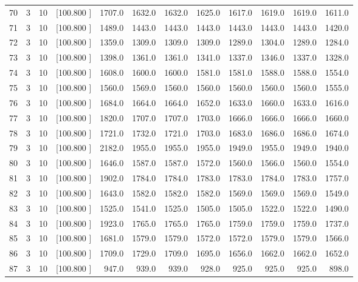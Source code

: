 \documentclass[12pt,a4paper]{article}
\begin{document}
\begin{center}
{\begin{tabular}{r r r r r r r r r r r r}
  70&  3& 10&[100.800   ]&  1707.0&  1632.0&  1632.0&  1625.0&  1617.0&  1619.0&  1619.0&  1611.0\\[-0.02in]
  71&  3& 10&[100.800   ]&  1489.0&  1443.0&  1443.0&  1443.0&  1443.0&  1443.0&  1443.0&  1420.0\\[-0.02in]
  72&  3& 10&[100.800   ]&  1359.0&  1309.0&  1309.0&  1309.0&  1289.0&  1304.0&  1289.0&  1284.0\\[-0.02in]
  73&  3& 10&[100.800   ]&  1398.0&  1361.0&  1361.0&  1341.0&  1337.0&  1346.0&  1337.0&  1328.0\\[-0.02in]
  74&  3& 10&[100.800   ]&  1608.0&  1600.0&  1600.0&  1581.0&  1581.0&  1588.0&  1588.0&  1554.0\\[-0.02in]
  75&  3& 10&[100.800   ]&  1560.0&  1569.0&  1560.0&  1560.0&  1560.0&  1560.0&  1560.0&  1555.0\\[-0.02in]
  76&  3& 10&[100.800   ]&  1684.0&  1664.0&  1664.0&  1652.0&  1633.0&  1660.0&  1633.0&  1616.0\\[-0.02in]
  77&  3& 10&[100.800   ]&  1820.0&  1707.0&  1707.0&  1703.0&  1666.0&  1666.0&  1666.0&  1660.0\\[-0.02in]
  78&  3& 10&[100.800   ]&  1721.0&  1732.0&  1721.0&  1703.0&  1683.0&  1686.0&  1686.0&  1674.0\\[-0.02in]
  79&  3& 10&[100.800   ]&  2182.0&  1955.0&  1955.0&  1955.0&  1949.0&  1955.0&  1949.0&  1940.0\\[-0.02in]
  80&  3& 10&[100.800   ]&  1646.0&  1587.0&  1587.0&  1572.0&  1560.0&  1566.0&  1560.0&  1554.0\\[-0.02in]
  81&  3& 10&[100.800   ]&  1902.0&  1784.0&  1784.0&  1783.0&  1783.0&  1784.0&  1783.0&  1757.0\\[-0.02in]
  82&  3& 10&[100.800   ]&  1643.0&  1582.0&  1582.0&  1582.0&  1569.0&  1569.0&  1569.0&  1549.0\\[-0.02in]
  83&  3& 10&[100.800   ]&  1525.0&  1541.0&  1525.0&  1505.0&  1505.0&  1522.0&  1522.0&  1490.0\\[-0.02in]
  84&  3& 10&[100.800   ]&  1923.0&  1765.0&  1765.0&  1765.0&  1759.0&  1759.0&  1759.0&  1737.0\\[-0.02in]
  85&  3& 10&[100.800   ]&  1681.0&  1579.0&  1579.0&  1572.0&  1572.0&  1579.0&  1579.0&  1566.0\\[-0.02in]
  86&  3& 10&[100.800   ]&  1709.0&  1729.0&  1709.0&  1695.0&  1656.0&  1662.0&  1662.0&  1652.0\\[-0.02in]
  87&  3& 10&[100.800   ]&   947.0&   939.0&   939.0&   928.0&   925.0&   925.0&   925.0&   898.0\\[-0.02in]

\end{tabular}}
\end{center}
\end{document}
